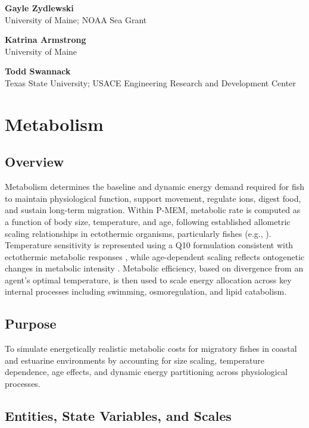 \documentclass[
]{book}
\begin{document}
\textbf{Gayle Zydlewski}\\
University of Maine; NOAA Sea Grant

\textbf{Katrina Armstrong}\\
University of Maine

\textbf{Todd Swannack}\\
Texas State University; USACE Engineering Research and Development Center

\chapter{Metabolism}\label{metabolism}

\section{Overview}\label{overview}

Metabolism determines the baseline and dynamic energy demand required for fish to maintain physiological function, support movement, regulate ions, digest food, and sustain long-term migration. Within P-MEM, metabolic rate is computed as a function of body size, temperature, and age, following established allometric scaling relationships in ectothermic organisms, particularly fishes (e.g., \citep{kleiber_body_1932, west_general_1997, brown_toward_2004}). Temperature sensitivity is represented using a Q10 formulation consistent with ectothermic metabolic responses \citep{schmidt_nielsen_animal_1997}, while age-dependent scaling reflects ontogenetic changes in metabolic intensity \citep{glazier_beyond_2005, glazier_relevance_2023}. Metabolic efficiency, based on divergence from an agent's optimal temperature, is then used to scale energy allocation across key internal processes including swimming, osmoregulation, and lipid catabolism.

\section{Purpose}\label{purpose}

To simulate energetically realistic metabolic costs for migratory fishes
in coastal and estuarine environments by accounting for size scaling,
temperature dependence, age effects, and dynamic energy partitioning
across physiological processes.

\section{Entities, State Variables, and Scales}\label{entities-state-variables-and-scales}
\end{document}

